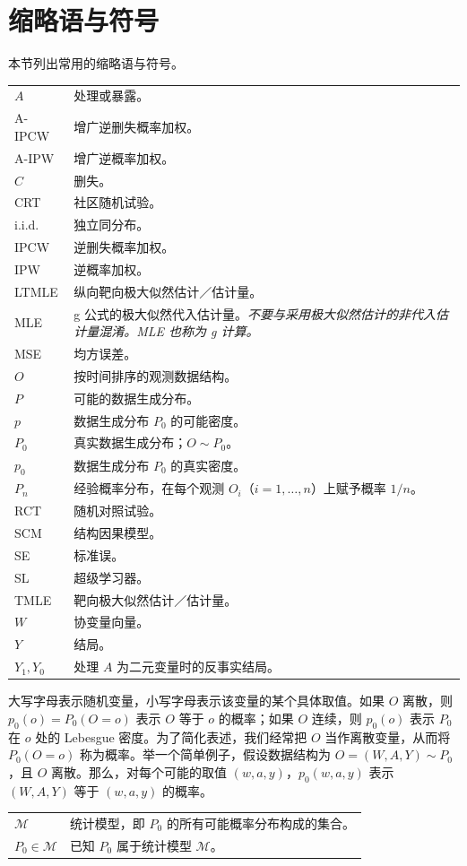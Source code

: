 \chapter*{缩略语与符号}

本节列出常用的缩略语与符号。
\begin{longtable}{@{}p{}p{}@{}}
$A$ & 处理或暴露。 \\
A-IPCW & 增广逆删失概率加权。 \\
A-IPW & 增广逆概率加权。 \\
$C$ & 删失。 \\
CRT & 社区随机试验。 \\
i.i.d. & 独立同分布。 \\
IPCW & 逆删失概率加权。 \\
IPW & 逆概率加权。 \\
LTMLE & 纵向靶向极大似然估计／估计量。 \\
MLE & g 公式的极大似然代入估计量。\emph{不要与采用极大似然估计的非代入估计量混淆。MLE 也称为 g 计算。} \\
MSE & 均方误差。 \\
$O$ & 按时间排序的观测数据结构。 \\
$P$ & 可能的数据生成分布。 \\
$p$ & 数据生成分布 $P_0$ 的可能密度。 \\
$P_0$ & 真实数据生成分布；$O\sim P_0$。 \\
$p_0$ & 数据生成分布 $P_0$ 的真实密度。 \\
$P_n$ & 经验概率分布，在每个观测 $O_i$（$i=1,\ldots,n$）上赋予概率 $1/n$。 \\
RCT & 随机对照试验。 \\
SCM & 结构因果模型。 \\
SE & 标准误。 \\
SL & 超级学习器。 \\
TMLE & 靶向极大似然估计／估计量。 \\
$W$ & 协变量向量。 \\
$Y$ & 结局。 \\
$Y_1,Y_0$ & 处理 $A$ 为二元变量时的反事实结局。 \\
\end{longtable}

大写字母表示随机变量，小写字母表示该变量的某个具体取值。如果 $O$ 离散，则 $p_0(o)=P_0(O=o)$ 表示 $O$ 等于 $o$ 的概率；如果 $O$ 连续，则 $p_0(o)$ 表示 $P_0$ 在 $o$ 处的 Lebesgue 密度。为了简化表述，我们经常把 $O$ 当作离散变量，从而将 $P_0(O=o)$ 称为概率。举一个简单例子，假设数据结构为 $O=(W,A,Y)\sim P_0$，且 $O$ 离散。那么，对每个可能的取值 $(w,a,y)$，$p_0(w,a,y)$ 表示 $(W,A,Y)$ 等于 $(w,a,y)$ 的概率。
\begin{longtable}{@{}p{}p{}@{}}
$\mathcal M$ & 统计模型，即 $P_0$ 的所有可能概率分布构成的集合。 \\
$P_0\in\mathcal M$ & 已知 $P_0$ 属于统计模型 $\mathcal M$。 \\
\end{longtable}

